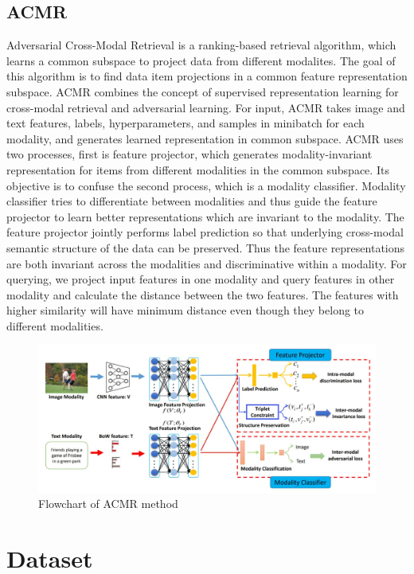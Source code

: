 \documentclass[10pt]{scrartcl}
\begin{document}
\subsection{ACMR}
Adversarial Cross-Modal Retrieval is a ranking-based retrieval algorithm, which learns a common subspace to project data from different modalites. The goal of this algorithm is to find data item projections in a common feature representation subspace. ACMR combines the concept of supervised representation learning for cross-modal retrieval and adversarial learning. For input, ACMR takes image and text features, labels, hyperparameters, and samples in minibatch for each modality, and generates learned representation in common subspace. ACMR uses two processes, first is feature projector, which generates modality-invariant representation for items from different modalities in the common subspace. Its objective is to confuse the second process, which is a modality classifier. Modality classifier tries to differentiate between modalities and thus guide the feature projector to learn better representations which are invariant to the modality. The feature projector jointly performs label prediction so that underlying cross-modal semantic structure of the data can be preserved. Thus the feature representations are both invariant across the modalities and discriminative within a modality. For querying, we project input features in one modality and query features in other modality and calculate the distance between the two features. The features with higher similarity will have minimum distance even though they belong to different modalities. 

\begin{figure}
    \centering
    \includegraphics[width=0.8\linewidth]{ACMR.JPG}
    \caption{Flowchart of ACMR method}
    \label{fig:my_label}
\end{figure}

\section{Dataset}
\end{document}
